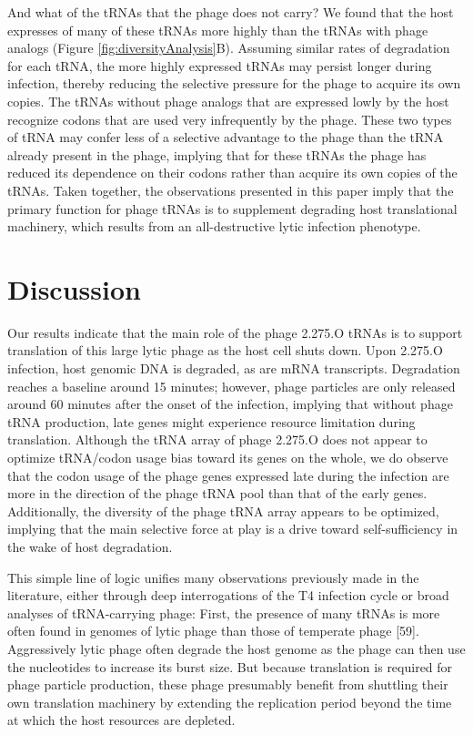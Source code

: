 \documentclass[12pt,twoside]{mitthesis-manusdown}
\begin{document}
And what of the tRNAs that the phage does not carry? We found that the
host expresses of many of these tRNAs more highly than the tRNAs with
phage analogs (Figure \ref{fig:diversityAnalysis}B). Assuming similar
rates of degradation for each tRNA, the more highly expressed tRNAs may
persist longer during infection, thereby reducing the selective pressure
for the phage to acquire its own copies. The tRNAs without phage analogs
that are expressed lowly by the host recognize codons that are used very
infrequently by the phage. These two types of tRNA may confer less of a
selective advantage to the phage than the tRNA already present in the
phage, implying that for these tRNAs the phage has reduced its
dependence on their codons rather than acquire its own copies of the
tRNAs. Taken together, the observations presented in this paper imply
that the primary function for phage tRNAs is to supplement degrading
host translational machinery, which results from an all-destructive
lytic infection phenotype.

\section{Discussion}\label{discussion}

Our results indicate that the main role of the phage 2.275.O tRNAs is to
support translation of this large lytic phage as the host cell shuts
down. Upon 2.275.O infection, host genomic DNA is degraded, as are mRNA
transcripts. Degradation reaches a baseline around 15 minutes; however,
phage particles are only released around 60 minutes after the onset of
the infection, implying that without phage tRNA production, late genes
might experience resource limitation during translation. Although the
tRNA array of phage 2.275.O does not appear to optimize tRNA/codon usage
bias toward its genes on the whole, we do observe that the codon usage
of the phage genes expressed late during the infection are more in the
direction of the phage tRNA pool than that of the early genes.
Additionally, the diversity of the phage tRNA array appears to be
optimized, implying that the main selective force at play is a drive
toward self-sufficiency in the wake of host degradation.

This simple line of logic unifies many observations previously made in
the literature, either through deep interrogations of the T4 infection
cycle or broad analyses of tRNA-carrying phage: First, the presence of
many tRNAs is more often found in genomes of lytic phage than those of
temperate phage {[}59{]}. Aggressively lytic phage often degrade the
host genome as the phage can then use the nucleotides to increase its
burst size. But because translation is required for phage particle
production, these phage presumably benefit from shuttling their own
translation machinery by extending the replication period beyond the
time at which the host resources are depleted.
\end{document}
